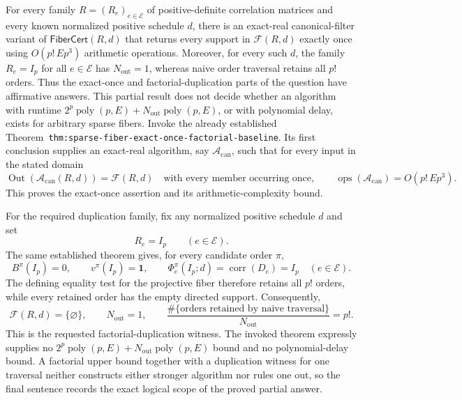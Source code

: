 For every family \(R=(R_e)_{e\in\mathcal E}\) of positive-definite correlation matrices and every known normalized positive schedule \(d\), there is an exact-real canonical-filter variant of \(\mathsf{FiberCert}(R,d)\) that returns every support in \(\mathcal F(R,d)\) exactly once using \(O(p!\,E p^3)\) arithmetic operations. Moreover, for every such \(d\), the family \(R_e=I_p\) for all \(e\in\mathcal E\) has \(N_{\mathrm{out}}=1\), whereas naive order traversal retains all \(p!\) orders. Thus the exact-once and factorial-duplication parts of the question have affirmative answers. This partial result does not decide whether an algorithm with runtime \(2^p\operatorname{poly}(p,E)+N_{\mathrm{out}}\operatorname{poly}(p,E)\), or with polynomial delay, exists for arbitrary sparse fibers.
Invoke the already established Theorem~\texttt{thm:sparse-fiber-exact-once-factorial-baseline}. Its first conclusion supplies an exact-real algorithm, say \(\mathcal A_{\mathrm{can}}\), such that for every input in the stated domain
\[
 \operatorname{Out}(\mathcal A_{\mathrm{can}}(R,d))
 =\mathcal F(R,d)
 \quad\text{with every member occurring once},
 \qquad
 \operatorname{ops}(\mathcal A_{\mathrm{can}})=O(p!\,E p^3).
\]
This proves the exact-once assertion and its arithmetic-complexity bound.

For the required duplication family, fix any normalized positive schedule \(d\) and set
\[
 R_e=I_p\qquad(e\in\mathcal E).
\]
The same established theorem gives, for every candidate order \(\pi\),
\[
 B^{\pi}(I_p)=0,
 \qquad
 v^{\pi}(I_p)=\mathbf 1,
 \qquad
 \Phi_e^{\pi}(I_p;d)=\operatorname{corr}(D_e)=I_p
 \quad(e\in\mathcal E).
\]
The defining equality test for the projective fiber therefore retains all \(p!\) orders, while every retained order has the empty directed support. Consequently,
\[
 \mathcal F(R,d)=\{\varnothing\},
 \qquad
 N_{\mathrm{out}}=1,
 \qquad
 \frac{\#\{\text{orders retained by naive traversal}\}}{N_{\mathrm{out}}}=p!.
\]
This is the requested factorial-duplication witness. The invoked theorem expressly supplies no \(2^p\operatorname{poly}(p,E)+N_{\mathrm{out}}\operatorname{poly}(p,E)\) bound and no polynomial-delay bound. A factorial upper bound together with a duplication witness for one traversal neither constructs either stronger algorithm nor rules one out, so the final sentence records the exact logical scope of the proved partial answer.

